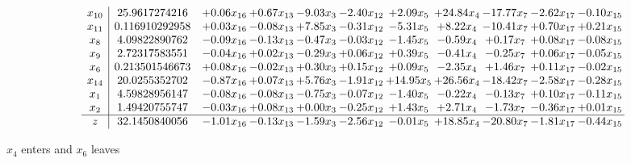 \documentclass[9pt]{article}
\begin{document}
 \[\begin{array}{c| c c@{\hskip 2pt} c@{\hskip 2pt} c@{\hskip 2pt} c@{\hskip 2pt} c@{\hskip 2pt} c@{\hskip 2pt} c@{\hskip 2pt} c@{\hskip 2pt} c@{\hskip 2pt} }
 x_{10}   &  25.9617274216 & +  0.06 x_{16} & +  0.67 x_{13} & -9.03 x_{3} & -2.40 x_{12} & +  2.09 x_{5} & + 24.84 x_{4} & -17.77 x_{7} & -2.62 x_{17} & -0.10 x_{15}\\
 x_{11}   &  0.116910292958 & +  0.03 x_{16} & -0.08 x_{13} & +  7.85 x_{3} & -0.31 x_{12} & -5.31 x_{5} & +  8.22 x_{4} & -10.41 x_{7} & +  0.70 x_{17} & +  0.21 x_{15}\\
 x_{8}   &  4.09822890762 & -0.09 x_{16} & -0.13 x_{13} & -0.47 x_{3} & -0.03 x_{12} & -1.45 x_{5} & -0.59 x_{4} & +  0.17 x_{7} & +  0.08 x_{17} & -0.08 x_{15}\\
 x_{9}   &  2.72317583551 & -0.04 x_{16} & +  0.02 x_{13} & -0.29 x_{3} & +  0.06 x_{12} & +  0.39 x_{5} & -0.41 x_{4} & -0.25 x_{7} & +  0.06 x_{17} & -0.05 x_{15}\\
 x_{6}   &  0.213501546673 & +  0.08 x_{16} & -0.02 x_{13} & +  0.30 x_{3} & +  0.15 x_{12} & +  0.09 x_{5} & -2.35 x_{4} & +  1.46 x_{7} & +  0.11 x_{17} & -0.02 x_{15}\\
 x_{14}   &  20.0255352702 & -0.87 x_{16} & +  0.07 x_{13} & +  5.76 x_{3} & -1.91 x_{12} & + 14.95 x_{5} & + 26.56 x_{4} & -18.42 x_{7} & -2.58 x_{17} & -0.28 x_{15}\\
 x_{1}   &  4.59828956147 & -0.08 x_{16} & -0.08 x_{13} & -0.75 x_{3} & -0.07 x_{12} & -1.40 x_{5} & -0.22 x_{4} & -0.13 x_{7} & +  0.10 x_{17} & -0.11 x_{15}\\
 x_{2}   &  1.49420755747 & -0.03 x_{16} & +  0.08 x_{13} & +  0.00 x_{3} & -0.25 x_{12} & +  1.43 x_{5} & +  2.71 x_{4} & -1.73 x_{7} & -0.36 x_{17} & +  0.01 x_{15}\\
\hline
z    &  32.1450840056 & -1.01 x_{16} & -0.13 x_{13} & -1.59 x_{3} & -2.56 x_{12} & -0.01 x_{5} & + 18.85 x_{4} & -20.80 x_{7} & -1.81 x_{17} & -0.44 x_{15}\\
\end{array}\]


 $ x_{4} $ enters and $ x_{6} $ leaves 
\end{document}
